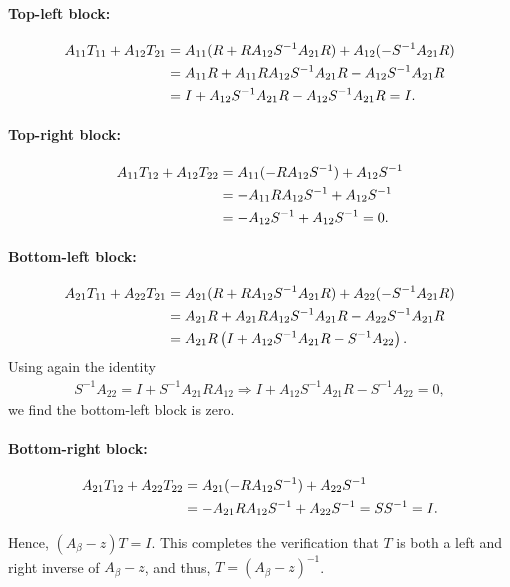 \documentclass[reqno,12pt,letterpaper]{amsart}
\numberwithin{equation}{section}
\newcommand{\1}{\mathds{1}}
\theoremstyle{definition}
\begin{document}
	\paragraph{Top-left block:}
	\begin{align}
		A_{11} T_{11} + A_{12} T_{21}
		&= A_{11}(R + R A_{12} S^{-1} A_{21} R) + A_{12} (-S^{-1} A_{21} R) \notag \\
		&= A_{11} R + A_{11} R A_{12} S^{-1} A_{21} R - A_{12} S^{-1} A_{21} R \notag \\
		&= I + A_{12} S^{-1} A_{21} R - A_{12} S^{-1} A_{21} R = I.
	\end{align}
	
	\paragraph{Top-right block:}
	\begin{align}
		A_{11} T_{12} + A_{12} T_{22}
		&= A_{11}(- R A_{12} S^{-1}) + A_{12} S^{-1} \notag \\
		&= -A_{11} R A_{12} S^{-1} + A_{12} S^{-1} \notag \\
		&= - A_{12} S^{-1} + A_{12} S^{-1} = 0.
	\end{align}
	
	\paragraph{Bottom-left block:}
	\begin{align}
		A_{21} T_{11} + A_{22} T_{21}
		&= A_{21}(R + R A_{12} S^{-1} A_{21} R) + A_{22}(-S^{-1} A_{21} R) \notag \\
		&= A_{21} R + A_{21} R A_{12} S^{-1} A_{21} R - A_{22} S^{-1} A_{21} R \notag \\
		&= A_{21} R \left( I + A_{12} S^{-1} A_{21} R - S^{-1} A_{22} \right).
	\end{align}
	Using again the identity
	\begin{align}
		S^{-1} A_{22} = I + S^{-1} A_{21} R A_{12}
		\Rightarrow I + A_{12} S^{-1} A_{21} R - S^{-1} A_{22} = 0,
	\end{align}
	we find the bottom-left block is zero.
	
	\paragraph{Bottom-right block:}
	\begin{align}
		A_{21} T_{12} + A_{22} T_{22}
		&= A_{21}(- R A_{12} S^{-1}) + A_{22} S^{-1} \notag \\
		&= -A_{21} R A_{12} S^{-1} + A_{22} S^{-1} = S S^{-1} = I.
	\end{align}
	
	\medskip
	
	Hence, $
		(A_\beta - z) T = I$.
	This completes the verification that \( T \) is both a left and right inverse of \( A_\beta - z \), and thus, $
		T = (A_\beta - z)^{-1}$.
	

	
	
\end{document}
